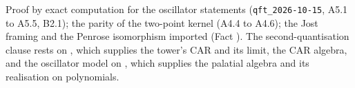 Proof by exact computation for the oscillator statements (\texttt{qft\_2026-10-15}, A5.1 to A5.5, B2.1); the parity of the two-point kernel (A4.4 to A4.6); the Jost framing and the Penrose isomorphism imported (Fact ). The second-quantisation clause rests on , which supplies the tower's CAR and its limit, the CAR algebra, and the oscillator model on , which supplies the palatial algebra and its realisation on polynomials.
